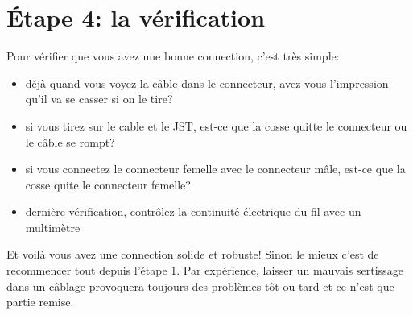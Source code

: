 \documentclass{article}
\begin{document}
\newpage
\section*{Étape 4: la vérification}

Pour vérifier que vous avez une bonne connection, c'est très simple:
\begin{itemize}
    \item déjà quand vous voyez la câble dans le connecteur, avez-vous l'impression qu'il va se casser si on le tire? 
    \item si vous tirez sur le cable et le JST, est-ce que la cosse quitte le connecteur ou le câble se rompt?
    \item si vous connectez le connecteur femelle avec le connecteur mâle, est-ce que la cosse quite le connecteur femelle?
    \item dernière vérification, contrôlez la continuité électrique du fil avec un multimètre
\end{itemize}

Et voilà vous avez une connection solide et robuste! Sinon le mieux c'est de recommencer tout depuis l'étape 1. Par expérience, laisser un mauvais sertissage dans un câblage provoquera toujours des problèmes tôt ou tard et ce n'est que partie remise.
\end{document}
